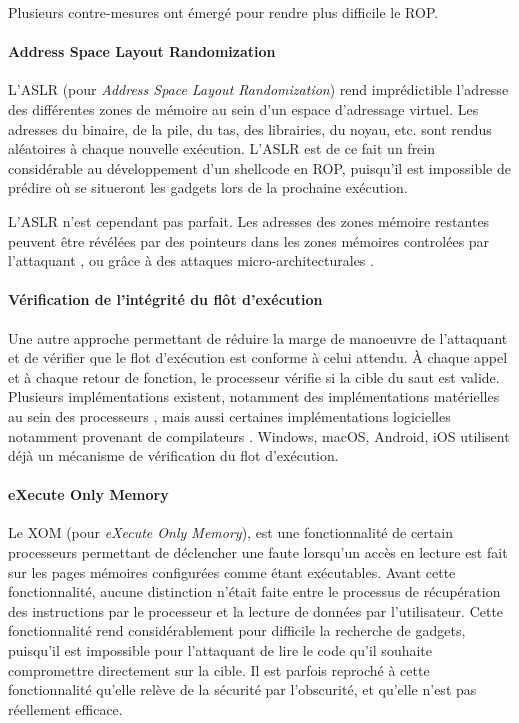 Plusieurs contre-mesures ont émergé pour rendre plus difficile le ROP.

\paragraph{Address Space Layout Randomization}
\label{aslr}
L'ASLR (pour \emph{Address Space Layout Randomization}) rend imprédictible l'adresse des différentes zones de mémoire au sein d'un espace d'adressage virtuel. Les adresses du binaire, de la pile, du tas, des librairies, du noyau, etc. sont rendus aléatoires à chaque nouvelle exécution. L'ASLR est de ce fait un frein considérable au développement d'un shellcode en ROP, puisqu'il est impossible de prédire où se situeront les gadgets lors de la prochaine exécution.

L'ASLR n'est cependant pas parfait. Les adresses des zones mémoire restantes peuvent être révélées par des pointeurs dans les zones mémoires controlées par l'attaquant \cite{bypasskaslr}, ou grâce à des attaques micro-architecturales \cite{microarchitecturalbypass}.

\paragraph{Vérification de l'intégrité du flôt d'exécution}
\label{cfi}
Une autre approche permettant de réduire la marge de manoeuvre de l'attaquant et de vérifier que le flot d'exécution est conforme à celui attendu. À chaque appel et à chaque retour de fonction, le processeur vérifie si la cible du saut est valide. Plusieurs implémentations existent, notamment des implémentations matérielles au sein des processeurs \cite{intelpointerauth, armpointerauth}, mais aussi certaines implémentations logicielles notamment provenant de compilateurs \cite{compilerpointerauth}. Windows, macOS, Android, iOS utilisent déjà un mécanisme de vérification du flot d'exécution.

\paragraph{eXecute Only Memory}
\label{execute_only_memory}
Le XOM (pour \emph{eXecute Only Memory}), est une fonctionnalité de certain processeurs permettant de déclencher une faute lorsqu'un accès en lecture est fait sur les pages mémoires configurées comme étant exécutables. Avant cette fonctionnalité, aucune distinction n'était faite entre le processus de récupération des instructions par le processeur et la lecture de données par l'utilisateur. Cette fonctionnalité rend considérablement pour difficile la recherche de gadgets, puisqu'il est impossible pour l'attaquant de lire le code qu'il souhaite compromettre directement sur la cible.
Il est parfois reproché à cette fonctionnalité qu'elle relève de la sécurité par l'obscurité, et qu'elle n'est pas réellement efficace.

